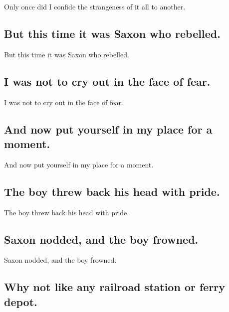 \documentclass[]{article}
\begin{document}
Only once did I confide the strangeness of it all to another.

\hypertarget{but-this-time-it-was-saxon-who-rebelled.}{%
\subsection{But this time it was Saxon who
rebelled.}\label{but-this-time-it-was-saxon-who-rebelled.}}

But this time it was Saxon who rebelled.

\hypertarget{i-was-not-to-cry-out-in-the-face-of-fear.}{%
\subsection{I was not to cry out in the face of
fear.}\label{i-was-not-to-cry-out-in-the-face-of-fear.}}

I was not to cry out in the face of fear.

\hypertarget{and-now-put-yourself-in-my-place-for-a-moment.}{%
\subsection{And now put yourself in my place for a
moment.}\label{and-now-put-yourself-in-my-place-for-a-moment.}}

And now put yourself in my place for a moment.

\hypertarget{the-boy-threw-back-his-head-with-pride.}{%
\subsection{The boy threw back his head with
pride.}\label{the-boy-threw-back-his-head-with-pride.}}

The boy threw back his head with pride.

\hypertarget{saxon-nodded-and-the-boy-frowned.}{%
\subsection{Saxon nodded, and the boy
frowned.}\label{saxon-nodded-and-the-boy-frowned.}}

Saxon nodded, and the boy frowned.

\hypertarget{why-not-like-any-railroad-station-or-ferry-depot.}{%
\subsection{Why not like any railroad station or ferry
depot.}\label{why-not-like-any-railroad-station-or-ferry-depot.}}
\end{document}
